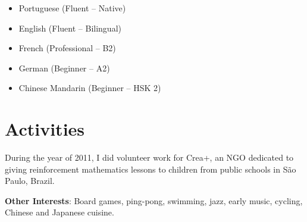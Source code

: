 \documentclass[12pt]{article}
\newcommand{\thesectionicon}{}
\newcommand{\sectionicon}[1]{\renewcommand{\thesectionicon}{#1}}
\begin{document}
\begin{minipage}[t]{0.45\textwidth}
\begin{itemize}
\setlength{\itemsep}{0pt}
\item Portuguese (Fluent – Native)
\item English (Fluent – Bilingual)
\item French (Professional – B2)
\end{itemize}
\end{minipage}
\begin{minipage}[t]{0.55\textwidth}
\begin{itemize}
\setlength{\itemsep}{0pt}
\item German (Beginner – A2)
\item Chinese Mandarin (Beginner – HSK 2)
\end{itemize}
\hfill
\end{minipage}

\sectionicon{\faRunning}
\section{Activities}

During the year of 2011, I did volunteer work for Crea+, an NGO dedicated to giving reinforcement mathematics lessons to children from public schools in São Paulo, Brazil.

\smallskip
\textbf{Other Interests}: Board games, ping-pong, swimming, jazz, early music, cycling, Chinese and Japanese cuisine.
\end{document}

